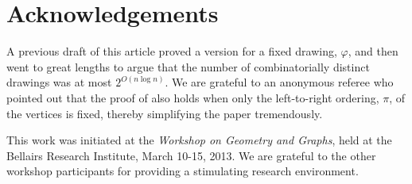 \documentclass{patmorin}
\renewcommand{\note}[1]{}
\begin{document}
\section*{Acknowledgements}

A previous draft of this article proved a version  for a
fixed drawing, $\varphi$, and then went to great lengths to argue that the
number of combinatorially distinct drawings was at most $2^{O(n\log n)}$.
We are grateful to an anonymous referee who pointed out that the proof
of  also holds when only the left-to-right ordering, $\pi$,
of the vertices is fixed, thereby simplifying the paper tremendously.

This work was initiated at the \emph{Workshop on Geometry and Graphs},
held at the Bellairs Research Institute, March 10-15, 2013.  We are
grateful to the other workshop participants for providing a stimulating
research environment.




\end{document}
